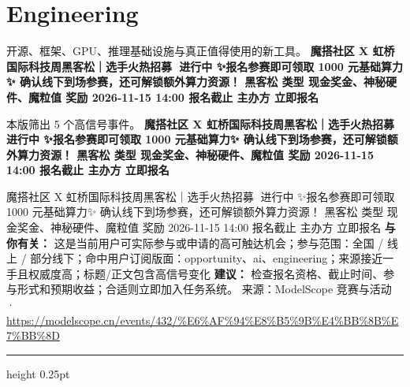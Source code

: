 \documentclass[10.5pt]{ctexart}
\begin{document}
\section*{Engineering}
{\color{ormuted} 开源、框架、GPU、推理基础设施与真正值得使用的新工具。}
\vspace{2mm}
{\LARGE\bfseries 魔搭社区 X 虹桥国际科技周黑客松｜选手火热招募🚀 进行中 ✨报名参赛即可领取 1000 元基础算力✨ 确认线下到场参赛，还可解锁额外算力资源！ 黑客松 类型 现金奖金、神秘硬件、魔粒值 奖励 2026-11-15 14:00 报名截止 主办方 立即报名}\par
\vspace{1mm}
{\color{ormuted} 本版筛出 5 个高信号事件。}
\vspace{3mm}
{\Large\bfseries 魔搭社区 X 虹桥国际科技周黑客松｜选手火热招募🚀 进行中 ✨报名参赛即可领取 1000 元基础算力✨ 确认线下到场参赛，还可解锁额外算力资源！ 黑客松 类型 现金奖金、神秘硬件、魔粒值 奖励 2026-11-15 14:00 报名截止 主办方 立即报名}\par
魔搭社区 X 虹桥国际科技周黑客松｜选手火热招募🚀 进行中 ✨报名参赛即可领取 1000 元基础算力✨ 确认线下到场参赛，还可解锁额外算力资源！ 黑客松 类型 现金奖金、神秘硬件、魔粒值 奖励 2026-11-15 14:00 报名截止 主办方 立即报名
\textbf{与你有关：} 这是当前用户可实际参与或申请的高可触达机会；参与范围：全国 / 线上 / 部分线下；命中用户订阅版面：opportunity、ai、engineering；来源接近一手且权威度高；标题/正文包含高信号变化
\textbf{建议：} 检查报名资格、截止时间、参与形式和预期收益；合适则立即加入任务系统。
{\footnotesize\color{ormuted} 来源：ModelScope 竞赛与活动 · \url{https://modelscope.cn/events/432/%E6%AF%94%E8%B5%9B%E4%BB%8B%E7%BB%8D}}
\vspace{4mm}
\hrule height 0.25pt
\vspace{3mm}
\end{document}
